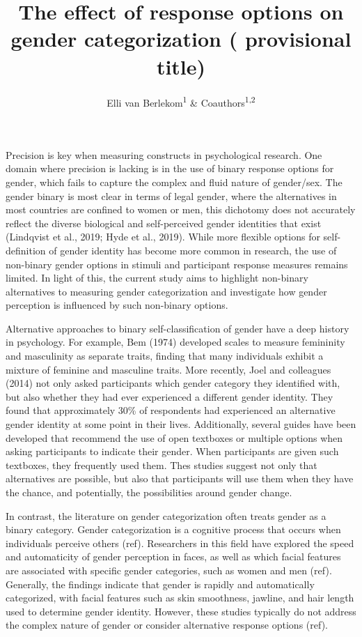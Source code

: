 \documentclass[
  man]{apa7}
\title{The effect of response options on gender categorization ( provisional title)}
\author{Elli van Berlekom\textsuperscript{1} \& Coauthors\textsuperscript{1,2}}
\date{}
\affiliation{\vspace{0.5cm}\textsuperscript{1} Stockholm University\\\textsuperscript{2} Lund University}
\begin{document}
\maketitle

Precision is key when measuring constructs in psychological research. One domain where precision is lacking is in the use of binary response options for gender, which fails to capture the complex and fluid nature of gender/sex. The gender binary is most clear in terms of legal gender, where the alternatives in most countries are confined to women or men, this dichotomy does not accurately reflect the diverse biological and self-perceived gender identities that exist (Lindqvist et al., 2019; Hyde et al., 2019). While more flexible options for self-definition of gender identity has become more common in research, the use of non-binary gender options in stimuli and participant response measures remains limited. In light of this, the current study aims to highlight non-binary alternatives to measuring gender categorization and investigate how gender perception is influenced by such non-binary options.

Alternative approaches to binary self-classification of gender have a deep history in psychology. For example, Bem (1974) developed scales to measure femininity and masculinity as separate traits, finding that many individuals exhibit a mixture of feminine and masculine traits. More recently, Joel and colleagues (2014) not only asked participants which gender category they identified with, but also whether they had ever experienced a different gender identity. They found that approximately 30\% of respondents had experienced an alternative gender identity at some point in their lives. Additionally, several guides have been developed that recommend the use of open textboxes or multiple options when asking participants to indicate their gender. When participants are given such textboxes, they frequently used them. Thes studies suggest not only that alternatives are possible, but also that participants will use them when they have the chance, and potentially, the possibilities around gender change.

In contrast, the literature on gender categorization often treats gender as a binary category. Gender categorization is a cognitive process that occurs when individuals perceive others (ref). Researchers in this field have explored the speed and automaticity of gender perception in faces, as well as which facial features are associated with specific gender categories, such as women and men (ref). Generally, the findings indicate that gender is rapidly and automatically categorized, with facial features such as skin smoothness, jawline, and hair length used to determine gender identity. However, these studies typically do not address the complex nature of gender or consider alternative response options (ref).
\end{document}
